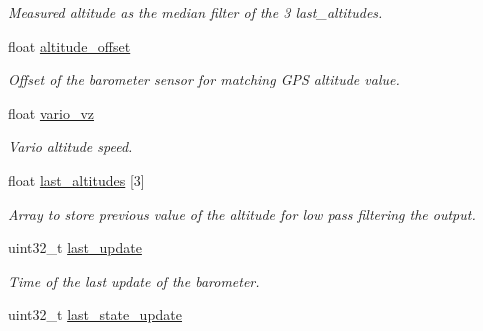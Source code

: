 \begin{DoxyCompactItemize}
\begin{DoxyCompactList}\small\item\em Measured altitude as the median filter of the 3 last\+\_\+altitudes. \end{DoxyCompactList}\item 
\hypertarget{structbarometer__t_ab5fed21247f27c2939945acb086222f4}{float \hyperlink{structbarometer__t_ab5fed21247f27c2939945acb086222f4}{altitude\+\_\+offset}}\label{structbarometer__t_ab5fed21247f27c2939945acb086222f4}

\begin{DoxyCompactList}\small\item\em Offset of the barometer sensor for matching G\+P\+S altitude value. \end{DoxyCompactList}\item 
\hypertarget{structbarometer__t_a58a2d3806e22eba5b244f91f0a8122ad}{float \hyperlink{structbarometer__t_a58a2d3806e22eba5b244f91f0a8122ad}{vario\+\_\+vz}}\label{structbarometer__t_a58a2d3806e22eba5b244f91f0a8122ad}

\begin{DoxyCompactList}\small\item\em Vario altitude speed. \end{DoxyCompactList}\item 
\hypertarget{structbarometer__t_af8f791e50112bbb857f1a1fd5d69f242}{float \hyperlink{structbarometer__t_af8f791e50112bbb857f1a1fd5d69f242}{last\+\_\+altitudes} \mbox{[}3\mbox{]}}\label{structbarometer__t_af8f791e50112bbb857f1a1fd5d69f242}

\begin{DoxyCompactList}\small\item\em Array to store previous value of the altitude for low pass filtering the output. \end{DoxyCompactList}\item 
\hypertarget{structbarometer__t_ad588bc5629f0f02730b74e24f22a8ea1}{uint32\+\_\+t \hyperlink{structbarometer__t_ad588bc5629f0f02730b74e24f22a8ea1}{last\+\_\+update}}\label{structbarometer__t_ad588bc5629f0f02730b74e24f22a8ea1}

\begin{DoxyCompactList}\small\item\em Time of the last update of the barometer. \end{DoxyCompactList}\item 
\hypertarget{structbarometer__t_a11741d9a269124d2d28bbfae3171d057}{uint32\+\_\+t \hyperlink{structbarometer__t_a11741d9a269124d2d28bbfae3171d057}{last\+\_\+state\+\_\+update}}\label{structbarometer__t_a11741d9a269124d2d28bbfae3171d057}


\end{DoxyCompactItemize}
